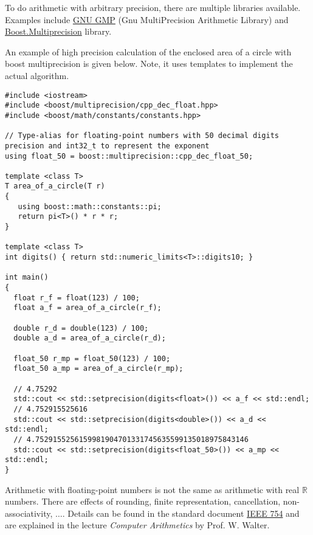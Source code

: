 \begin{rem}
  To do arithmetic with arbitrary precision, there are multiple libraries available. Examples include \href{https://gmplib.org/}{GNU GMP}
  (Gnu MultiPrecision Arithmetic Library) and \href{https://www.boost.org/doc/libs/1_71_0/libs/multiprecision/doc/html/index.html}{Boost.Multiprecision} library.

  An example of high precision calculation of the enclosed area of a circle with boost multiprecision is given below. Note, it uses templates to
  implement the actual algorithm.
\end{rem}
\begin{verbatim}
#include <iostream>
#include <boost/multiprecision/cpp_dec_float.hpp>
#include <boost/math/constants/constants.hpp>

// Type-alias for floating-point numbers with 50 decimal digits precision and int32_t to represent the exponent
using float_50 = boost::multiprecision::cpp_dec_float_50;

template <class T>
T area_of_a_circle(T r)
{
   using boost::math::constants::pi;
   return pi<T>() * r * r;
}

template <class T>
int digits() { return std::numeric_limits<T>::digits10; }

int main()
{
  float r_f = float(123) / 100;
  float a_f = area_of_a_circle(r_f);

  double r_d = double(123) / 100;
  double a_d = area_of_a_circle(r_d);

  float_50 r_mp = float_50(123) / 100;
  float_50 a_mp = area_of_a_circle(r_mp);

  // 4.75292
  std::cout << std::setprecision(digits<float>()) << a_f << std::endl;
  // 4.752915525616
  std::cout << std::setprecision(digits<double>()) << a_d << std::endl;
  // 4.7529155256159981904701331745635599135018975843146
  std::cout << std::setprecision(digits<float_50>()) << a_mp << std::endl;
}
\end{verbatim}


\begin{rem}
  Arithmetic with floating-point numbers is not the same as arithmetic with real $\mathbb{R}$ numbers. There are effects of rounding,
  finite representation, cancellation, non-associativity, $\ldots$. Details can be found in the standard document
  \href{https://standards.ieee.org/content/ieee-standards/en/standard/754-2019.html}{IEEE 754} and are explained in the lecture
  \emph{Computer Arithmetics} by Prof. W. Walter.
\end{rem}



